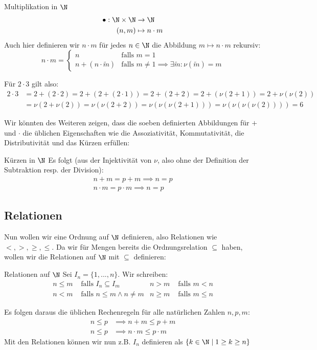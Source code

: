 \begin{definition}{Multiplikation in $\N$}{}
\begin{align*}
    \bullet: \N \times \N &\to \N\\
    (n,m) &\mapsto n \cdot m
\end{align*}
Auch hier definieren wir $n\cdot m$ für jedes $n \in \N$ die Abbildung $m \mapsto n \cdot m$ rekursiv:
$$n \cdot m = \begin{cases}n&\text{falls }m = 1 \\ n + (n \cdot \tilde{m}) & \text{falls } m\neq1 \implies \exists \tilde{m}: \nu(\tilde{m}) = m\end{cases}$$
\end{definition}
\begin{example}[ ] Für $2\cdot3$ gilt also:
\begin{align*}
    2 \cdot 3 &= 2 + (2 \cdot 2) = 2 + (2 + (2 \cdot 1)) = 2 + (2 + 2) = 2 + (\nu(2 + 1))= 2 + \nu(\nu(2))\\
              &= \nu(2 + \nu(2)) = \nu(\nu(2 + 2)) = \nu(\nu(\nu(2 + 1))) = \nu(\nu(\nu(\nu(2)))) = 6
\end{align*}
\end{example}

Wir könnten des Weiteren zeigen, dass die soeben definierten Abbildungen für $+$ und $\cdot$ die üblichen Eigenschaften wie die Assoziativität, Kommutativität, die Distributivität und das Kürzen erfüllen:

\begin{lemma}{Kürzen in $\N$}{}
Es folgt (aus der Injektivität von $\nu$, also ohne der Definition der Subtraktion resp. der Division):
\begin{align*}
    n + m = p + m \implies n = p\\
    n\cdot m = p \cdot m \implies n = p
\end{align*}
\end{lemma}

\subsection{Relationen}\label{cha_natural_number_ff}
Nun wollen wir eine Ordnung auf $\N$ definieren, also Relationen wie $<, >, \geq, \leq$. Da wir für Mengen bereits die Ordnungsrelation $\subseteq$ haben, wollen wir die Relationen auf $\N$ mit $\subseteq$ definieren:
\begin{definition}{Relationen auf $\N$}{}
Sei $I_n = \{1, ..., n\}$. Wir schreiben:
\begin{align*}
    n \leq m &\text{ falls } I_n \subseteq I_m &  n > m &\text{ falls } m < n\\
    n < m &\text{ falls } n \leq m \land n \neq m & n \geq m &\text{ falls } m \leq n
\end{align*}
\end{definition}
Es folgen daraus die üblichen Rechenregeln für alle natürlichen Zahlen $n, p, m$:
\begin{align*}
    n \leq p &\implies n + m \leq p + m\\
    n \leq p &\implies n \cdot m \leq p \cdot m
\end{align*}
Mit den Relationen können wir nun z.B. $I_n$ definieren als $\{ k \in \N \mid 1 \geq k \geq n\}$

